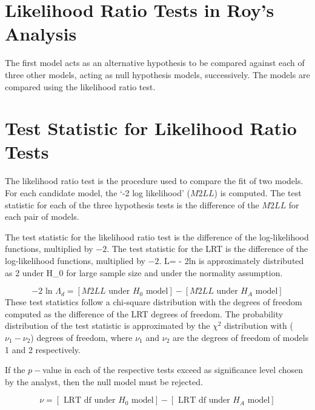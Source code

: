 \documentclass[12pt, a4paper]{report}
\theoremstyle{plain}
\theoremstyle{definition}
\theoremstyle{remark}
\begin{document}
\section{Likelihood Ratio Tests in Roy's Analysis}


The first model acts as an alternative hypothesis to be compared against each of three other models, acting as null hypothesis models, successively. The models are compared using the likelihood ratio test. 
\bigskip
\section{Test Statistic for Likelihood Ratio Tests}
The likelihood ratio test is the procedure used to compare the fit of two models. For each candidate model, the `-2 log likelihood' ($M2LL$) is computed. The test statistic for each of the three hypothesis tests is the difference of the $M2LL$ for each pair of models. 

The test statistic for the likelihood ratio test is the difference of the log-likelihood functions, multiplied by $-2$. 
The test statistic for the LRT is the difference of the log-likelihood functions, multiplied by $-2$.
L= - 2ln is approximately distributed as 2 under H\_0 for large sample size and under the normality assumption.

\begin{equation}
-2\mbox{ ln }\Lambda_{d} =  [ M2LL \mbox{ under }H_{0} \mbox{ model}] - [ M2LL \mbox{ under }H_{A} \mbox{ model}]
\end{equation}
These test statistics follow a chi-square distribution with the degrees of freedom computed as the difference of the LRT degrees of freedom.
The probability distribution of the test statistic is approximated by the $\chi^2$ distribution with ($\nu_{1} - \nu_{2}$) degrees of freedom, where $\nu_{1}$  and $\nu_{2}$ are the degrees of freedom of models 1 and 2 respectively.


If the $p-$value in each of the respective tests exceed as significance level chosen by the analyst, then the null model must be rejected.


\begin{equation}
\nu = [\mbox{ LRT df under }H_{0} \mbox{ model}] - [\mbox{ LRT df under }H_{A} \mbox{ model}]
\end{equation}
\end{document}
